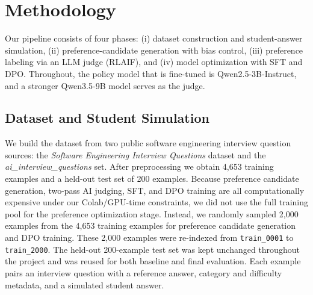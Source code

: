 \documentclass[10pt,twocolumn,letterpaper]{article}
\begin{document}
\section{Methodology}
\label{sec:method}

Our pipeline consists of four phases: (i) dataset construction and student-answer simulation, (ii) preference-candidate generation with bias control, (iii) preference labeling via an LLM judge (RLAIF), and (iv) model optimization with SFT and DPO. Throughout, the policy model that is fine-tuned is Qwen2.5-3B-Instruct, and a stronger Qwen3.5-9B model serves as the judge.

\subsection{Dataset and Student Simulation}
We build the dataset from two public software engineering interview question sources: the \emph{Software Engineering Interview Questions} dataset \cite{haris2024software} and the \emph{ai\_interview\_questions} set. After preprocessing we obtain 4,653 training examples and a held-out test set of 200 examples. Because preference candidate generation, two-pass AI judging, SFT, and DPO training are all computationally expensive under our Colab/GPU-time constraints, we did not use the full training pool for the preference optimization stage. Instead, we randomly sampled 2,000 examples from the 4,653 training examples for preference candidate generation and DPO training. These 2,000 examples were re-indexed from \texttt{train\_0001} to \texttt{train\_2000}. The held-out 200-example test set was kept unchanged throughout the project and was reused for both baseline and final evaluation. Each example pairs an interview question with a reference answer, category and difficulty metadata, and a simulated student answer.
\end{document}
